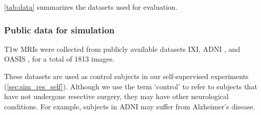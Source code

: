 \cref{tab:data} summarizes the datasets used for evaluation.

\subsubsection{Public data for simulation}

\ac{T1w} \acp{MRI} were collected from publicly available datasets \ac{IXI}, \ac{ADNI} \cite{jack_alzheimers_2008}, and \ac{OASIS} \cite{lamontagne_oasis-3_2019}, for a total of 1813 images.

These datasets are used as control subjects in our self-supervised experiments (\cref{sec:sim_res_self}).
Although we use the term `control' to refer to subjects that have not undergone resective surgery, they may have other neurological conditions.
For example, subjects in \ac{ADNI} may suffer from Alzheimer's disease.


\newcommand{\zoom}[3]{$ #1 \times #2 \times #3 $}
\newcommand{\mr}[2]{\multirow{#1}{*}{#2}}
\newcommand{\mrsp}[4]{\mr{#1}{\zoom{#2}{#3}{#4}}}

